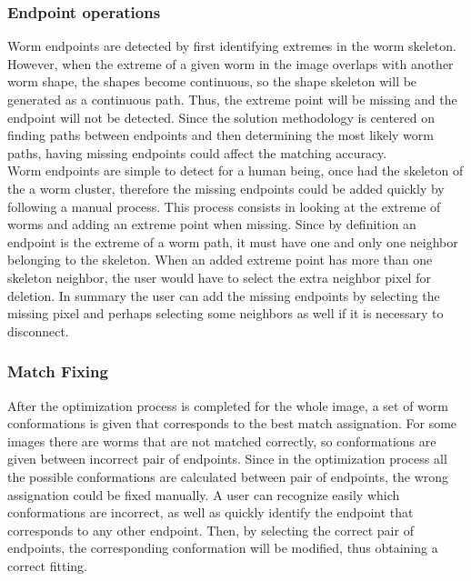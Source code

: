 \subsubsection{Endpoint operations}
\label{sec:endpointop}

Worm endpoints are detected by first identifying extremes in the worm
skeleton. However, when the extreme of a given worm in the image overlaps with 
another worm shape, the shapes become continuous, so the shape skeleton will be generated 
as a continuous path. Thus, the extreme point will be missing and the endpoint will not be 
detected. Since the solution methodology is centered on finding paths between endpoints and 
then determining the most likely worm paths, having missing endpoints could affect 
the matching accuracy.\\

Worm endpoints are simple to detect for a human being, once had the skeleton of the 
a worm cluster, therefore the missing endpoints could be added quickly by following a manual
process. This process consists in looking at the extreme of worms and adding an 
extreme point when missing. Since by definition an endpoint is the extreme of a worm path,
it must have one and only one neighbor belonging to the skeleton. When an added extreme
point has more than one skeleton neighbor, the user would have to select the extra
neighbor pixel for deletion.
In summary the user can add the missing endpoints by selecting the missing pixel
and perhaps selecting some neighbors as well if it is necessary to disconnect. 

\subsubsection{Match Fixing}
\label{sec:matchfix}

After the optimization process is completed for the whole image, a set of 
worm conformations is given that corresponds to the best match assignation.
For some images there are worms that are not matched correctly, so 
conformations are given between incorrect pair of endpoints. 
Since in the optimization process all the possible conformations are calculated
between pair of endpoints, the wrong assignation could be fixed manually. A user
can recognize easily which conformations are incorrect, as well as quickly 
identify the endpoint that corresponds to any other endpoint. Then, by selecting 
the correct pair of endpoints, the corresponding
conformation will be modified, thus obtaining a correct fitting.
